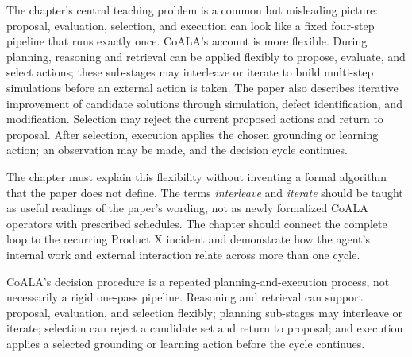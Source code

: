 The chapter's central teaching problem is a common but misleading picture: proposal, evaluation, selection, and execution can look like a fixed four-step pipeline that runs exactly once. CoALA's account is more flexible. During planning, reasoning and retrieval can be applied flexibly to propose, evaluate, and select actions; these sub-stages may interleave or iterate to build multi-step simulations before an external action is taken. The paper also describes iterative improvement of candidate solutions through simulation, defect identification, and modification. Selection may reject the current proposed actions and return to proposal. After selection, execution applies the chosen grounding or learning action; an observation may be made, and the decision cycle continues.

The chapter must explain this flexibility without inventing a formal algorithm that the paper does not define. The terms \emph{interleave} and \emph{iterate} should be taught as useful readings of the paper's wording, not as newly formalized CoALA operators with prescribed schedules. The chapter should connect the complete loop to the recurring Product X incident and demonstrate how the agent's internal work and external interaction relate across more than one cycle.

\begin{takeawaybox}
CoALA's decision procedure is a repeated planning-and-execution process, not necessarily a rigid one-pass pipeline. Reasoning and retrieval can support proposal, evaluation, and selection flexibly; planning sub-stages may interleave or iterate; selection can reject a candidate set and return to proposal; and execution applies a selected grounding or learning action before the cycle continues.
\end{takeawaybox}

